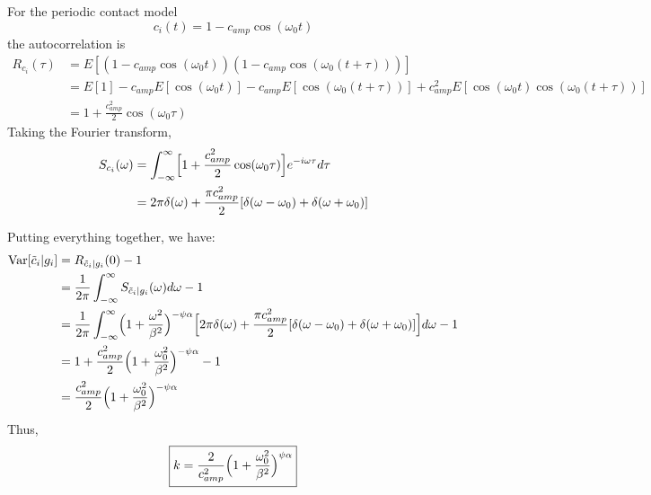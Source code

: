  For the periodic contact model
\begin{equation}
c_i(t) = 1 - c_{amp} \cos(\omega_0 t)
\end{equation}
the autocorrelation is 
\begin{align}
R_{c_i}(\tau)  &= E[(1 - c_{amp} \cos(\omega_0 t)) (1 - c_{amp} \cos(\omega_0 (t + \tau)))] \\ 
&= E[1] - c_{amp}E[\cos(\omega_0 t)] - c_{amp}E[\cos(\omega_0 (t + \tau))] + c_{amp}^2 E[\cos(\omega_0 t) \cos(\omega_0 (t + \tau))] \\ 
&= 1 + \frac{c_{amp}^2}{2} \cos(\omega_0 \tau) 
\end{align}
Taking the Fourier transform, 
\begin{align}
	S_{c_i}(\omega) &= \int_{-\infty}^{\infty} \Bigl[ 1 + \frac{c_{amp}^2}{2} \cos(\omega_0\tau) \Bigr] e^{-i\omega\tau}d\tau \\ 
	&= 2 \pi \delta(\omega) + \frac{\pi c_{amp}^2}{2}[\delta(\omega - \omega_0) + \delta(\omega + \omega_0)] 
\end{align}

 Putting everything together, we have: 
\begin{align}
\text{Var}[\tilde{c}_i | g_i] &= R_{\tilde{c}_i | g_i}(0) - 1 \\
&= \frac{1}{2\pi} \int_{-\infty}^{\infty} S_{\tilde{c}_i | g_i}(\omega) d\omega  - 1 \\
&= \frac{1}{2\pi} \int_{-\infty}^\infty \Bigl(1 + \frac{\omega^2}{\beta^2}\Bigr)^{-\psi \alpha} 
\Bigl[ 2 \pi \delta(\omega) + \frac{\pi c_{amp}^2}{2} [\delta(\omega - \omega_0) + \delta(\omega + \omega_0)] \Bigr] d \omega  - 1\\ 
&= 1 + \frac{c_{amp}^2}{2} \Bigl(1 + \frac{\omega_0^2}{\beta^2}\Bigr)^{-\psi \alpha} - 1 \\
&= \frac{c_{amp}^2}{2} \Bigl(1 + \frac{\omega_0^2}{\beta^2}\Bigr)^{-\psi \alpha}
\end{align}
Thus, 
\begin{equation}
	\boxed{k = \frac{2}{c_{amp}^2} \Bigl(1 + \frac{\omega_0^2}{\beta^2}\Bigr)^{\psi \alpha}}
\end{equation}

